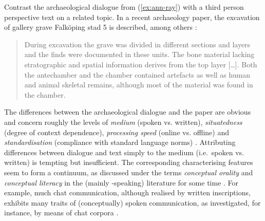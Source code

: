 \documentclass[output=paper
 	        ,biblatex
                ,babelshorthands
                ,newtxmath
                ,draftmode
                ,colorlinks, citecolor=brown
]{langscibook}
\begin{document}
Contrast the archaeological dialogue from (\ref{ex:ann-ray}) with a third person perspective text on a related topic.
%
In a recent archaeology paper, the excavation of gallery grave Falk\"{o}ping stad 5 is described, among others \citep[]{Blank:Tornberg:Knipper:2018}:
%
\begin{quote}
During excavation the grave was divided in different sections and layers and the finds were documented in these units. The bone material lacking stratographic and spatial information derives from the top layer [\ldots]. Both the antechamber and the chamber contained artefacts as well as human and animal skeletal remains, although most of the material was found in the chamber.
\end{quote}


The differences between the archaeological dialogue and the paper are obvious and concern roughly the levels of \emph{medium}  (spoken vs. written), \emph{situatedness}  (degree of context dependence), \emph{processing speed}  (online vs. offline) and \emph{standardisation}  (compliance with standard language norms) \citep{Klein:1985}.
%
Attributing differences between dialogue and text simply to the medium (i.e.\ spoken vs. written) is tempting but insufficient. 
%
The corresponding characterising features seem to form a continuum, as discussed under the terms \emph{conceptual orality}  and \emph{conceptual literacy}  in the (mainly -speaking) literature for some time \citep{Koch:Oesterreicher:1985}.
%
For example, much chat communication, although realised by written inscriptions, exhibits many traits of (conceptually) spoken communication, as investigated, for instance, by means of chat corpora \citep{Beisswenger:et:al:2012:a}. 
%
\end{document}
